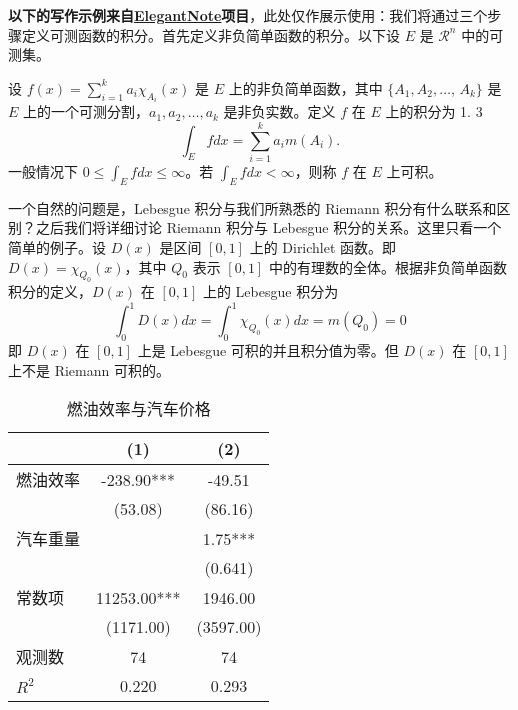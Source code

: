 \textbf{以下的写作示例来自\href{https://github.com/ElegantLaTeX/ElegantNote/blob/master/elegantnote-cn.tex}{ElegantNote}项目}，此处仅作展示使用：我们将通过三个步骤定义可测函数的积分。首先定义非负简单函数的积分。以下设 $E$ 是 $\mathcal{R}^n$ 中的可测集。

\begin{definition}[可积性]
设 $ f(x)=\sum\limits_{i=1}^{k} a_i \chi_{A_i}(x)$ 是 $E$ 上的非负简单函数，其中 $\{A_1,A_2,\ldots$, $A_k\}$ 是 $E$ 上的一个可测分割，$a_1,a_2,\ldots,a_k$ 是非负实数。定义 $f$ 在 $E$ 上的积分为 1. 3
\begin{equation}
   \label{inter}
   \int_{E} f dx = \sum_{i=1}^k a_i m(A_i).
\end{equation}
一般情况下 $0 \leq \int_{E} f dx \leq \infty$。若 $\int_{E} f dx < \infty$，则称 $f$ 在 $E$ 上可积。
\end{definition}

一个自然的问题是，Lebesgue 积分与我们所熟悉的 Riemann 积分有什么联系和区别？之后我们将详细讨论 Riemann 积分与 Lebesgue 积分的关系。这里只看一个简单的例子。设 $D(x)$ 是区间 $[0,1]$ 上的 Dirichlet 函数。即 $D(x)=\chi_{Q_0}(x)$，其中 $Q_0$ 表示 $[0,1]$ 中的有理数的全体。根据非负简单函数积分的定义，$D(x)$ 在 $[0,1]$ 上的 Lebesgue 积分为
\begin{equation}\label{inter2}
  \int_0^1 D(x)dx = \int_0^1 \chi_{Q_0} (x) dx = m(Q_0) = 0
\end{equation}
即 $D(x)$ 在 $[0,1]$ 上是 Lebesgue 可积的并且积分值为零。但 $D(x)$ 在 $[0,1]$ 上不是 Riemann 可积的。

\begin{table}[htbp]
  \centering
  \small
  \caption{燃油效率与汽车价格}
    \begin{tabular}{lcc}
    \toprule
                  &       (1)         &        (2)      \\
    \midrule
    燃油效率      &   -238.90***      &      -49.51     \\
                  &    (53.08)        &      (86.16)    \\
    汽车重量      &                   &        1.75***  \\
                  &                   &       (0.641)   \\
    常数项        &  11253.00***      &    1946.00      \\
                  &  (1171.00)        &   (3597.00)     \\
    观测数        &     74            &      74         \\
    $R^2$         &      0.220        &       0.293     \\
    \bottomrule
    \end{tabular}%
  \label{tab:reg}%
\end{table}%

